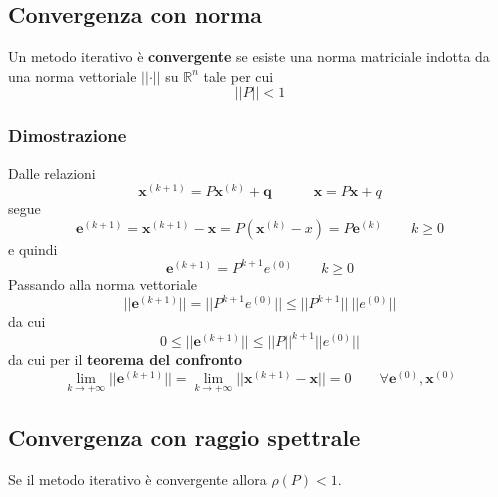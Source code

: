 \subsection{Convergenza con norma}
\begin{theorem}
	Un metodo iterativo è \textbf{convergente} se esiste una norma matriciale indotta da una norma vettoriale $\lvert\lvert \cdot\rvert\rvert$ su $\mathbb{R}^n$ tale per cui
	\begin{equation*}
		\lvert\lvert P \rvert\rvert < 1
	\end{equation*}
\end{theorem}

\subsubsection{Dimostrazione}
Dalle relazioni
\begin{equation*}
	\mathbf{x}^{(k+1)} = P\mathbf{x}^{(k)}+\mathbf{q} \quad\quad\quad \mathbf{x}=P\mathbf{x}+q
\end{equation*}
segue
\begin{equation*}
	\mathbf{e}^{(k+1)} = \mathbf{x}^{(k+1)} - \mathbf{x} = P(\mathbf{x}^{(k)}-x)=P\mathbf{e}^{(k)} \quad\quad k \geq 0
\end{equation*}
e quindi
\begin{equation*}
	\mathbf{e}^{(k+1)} = P^{k+1}e^{(0)} \quad\quad k\geq 0
\end{equation*}
Passando alla norma vettoriale
\begin{equation*}
	\lvert \lvert \mathbf{e}^{(k+1)} \rvert\rvert= \lvert\lvert P^{k+1}e^{(0)}\rvert\rvert  \leq  \lvert\lvert P^{k+1}\rvert\rvert\: \lvert\lvert e^{(0)}\rvert\rvert  
\end{equation*}
da cui
\begin{equation*}
	0 \leq \lvert \lvert \mathbf{e}^{(k+1)} \rvert\rvert \leq \lvert\lvert P\rvert\rvert^{k+1}\lvert\lvert e^{(0)}\rvert\rvert  
\end{equation*}
da cui per il \textbf{teorema del confronto}
\begin{equation*}
	\lim_{k \to +\infty} \lvert\lvert \mathbf{e}^{(k+1)} \rvert\rvert = \lim_{k \to +\infty} \lvert\lvert \mathbf{x}^{(k+1)}-\mathbf{x} \rvert\rvert = 0 \quad\quad \forall\mathbf{e}^{(0)},\mathbf{x}^{(0)}
\end{equation*}

\subsection{Convergenza con raggio spettrale}
\begin{theorem}
	Se il metodo iterativo è convergente allora $\rho(P)<1$.
\end{theorem}

